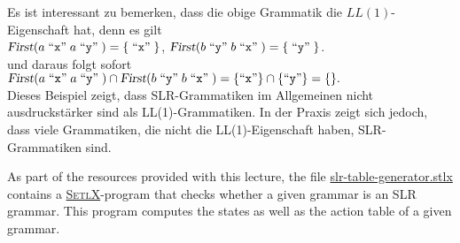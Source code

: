 Es ist interessant zu bemerken, dass die obige Grammatik die $LL(1)$-Eigenschaft hat, denn es gilt
\\[0.2cm]
\hspace*{1.3cm}
$\textsl{First}(a \;\mbox{``\texttt{x}''}\; a \;\mbox{``\texttt{y}''}\;) = \{ \;\mbox{``\texttt{x}''}\; \}$, \quad
$\textsl{First}(b \;\mbox{``\texttt{y}''}\; b \;\mbox{``\texttt{x}''}\;) = \{ \;\mbox{``\texttt{y}''}\; \}$.
\\[0.2cm]
und daraus folgt sofort
\\[0.2cm]
\hspace*{1.3cm}
$\textsl{First}(a \;\mbox{``\texttt{x}''}\; a \;\mbox{``\texttt{y}''}\;) \cap \textsl{First}(b \;\mbox{``\texttt{y}''}\; b \;\mbox{``\texttt{x}''}\;) =  
 \{ \mbox{``\texttt{x}''} \} \cap \{ \mbox{``\texttt{y}''} \} = \{\}. 
$
\\[0.2cm]
Dieses Beispiel zeigt, dass SLR-Grammatiken im Allgemeinen nicht ausdruckst\"arker sind als
LL(1)-Grammatiken.  In der Praxis zeigt sich jedoch, dass viele Grammatiken, die nicht die
LL(1)-Eigenschaft haben, SLR-Grammatiken sind.

\remarkEng
As part of the resources provided with this lecture,  the file
\href{https://github.com/karlstroetmann/Formal-Languages/tree/master/SetlX/slr-table-generator.stlx}{slr-table-generator.stlx}
contains a \href{http://wwwlehre.dhbw-stuttgart.de/~stroetma/SetlX/setlX.php}{\textsc{SetlX}}-program that
checks whether a given grammar is an SLR grammar.  This program computes the states as well as the
action table of a given grammar. \eox
\pagebreak

